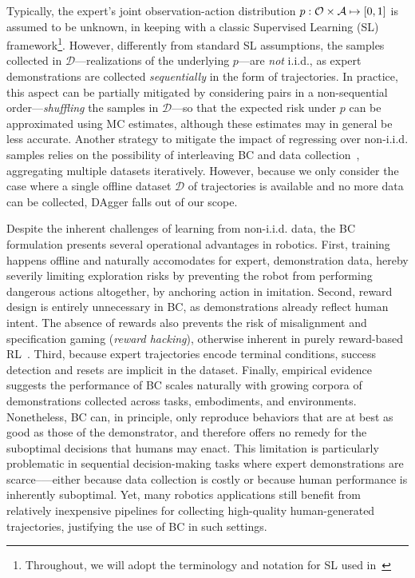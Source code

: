 Typically, the expert's joint observation-action distribution \( p: \mathcal O \times \mathcal A \mapsto [0,1] \) is assumed to be unknown, in keeping with a classic Supervised Learning (SL) framework\footnote{Throughout, we will adopt the terminology and notation for SL used in~\citet{shalev-shwartzUnderstandingMachineLearning2014}}.
However, differently from standard SL assumptions, the samples collected in \( \mathcal D \)---realizations of the underlying \( p \)---are \emph{not} i.i.d., as expert demonstrations are collected \emph{sequentially} in the form of trajectories.
In practice, this aspect can be partially mitigated by considering pairs in a non-sequential order---\emph{shuffling} the samples in \(\mathcal D \)---so that the expected risk under \( p \) can be approximated using MC estimates, although these estimates may in general be less accurate.
Another strategy to mitigate the impact of regressing over non-i.i.d. samples relies on the possibility of interleaving BC and data collection~\citep[DAgger]{rossReductionImitationLearning2011}, aggregating multiple datasets iteratively.
However, because we only consider the case where a single offline dataset \( \mathcal D \) of trajectories is available and no more data can be collected, DAgger falls out of our scope.

Despite the inherent challenges of learning from non-i.i.d. data, the BC formulation presents several operational advantages in robotics.
First, training happens offline and naturally accomodates for expert, demonstration data, hereby severily limiting exploration risks by preventing the robot from performing dangerous actions altogether, by anchoring action in imitation.
Second, reward design is entirely unnecessary in BC, as demonstrations already reflect human intent.
The absence of rewards also prevents the risk of misalignment and specification gaming (\emph{reward hacking}), otherwise inherent in purely reward-based RL~\citep{heessEmergenceLocomotionBehaviours2017}.
Third, because expert trajectories encode terminal conditions, success detection and resets are implicit in the dataset.
Finally, empirical evidence suggests the performance of BC scales naturally with growing corpora of demonstrations collected across tasks, embodiments, and environments.
Nonetheless, BC can, in principle, only reproduce behaviors that are at best as good as those of the demonstrator, and therefore offers no remedy for the suboptimal decisions that humans may enact.
This limitation is particularly problematic in sequential decision-making tasks where expert demonstrations are scarce--—either because data collection is costly or because human performance is inherently suboptimal. 
Yet, many robotics applications still benefit from relatively inexpensive pipelines for collecting high-quality human-generated trajectories, justifying the use of BC in such settings.

